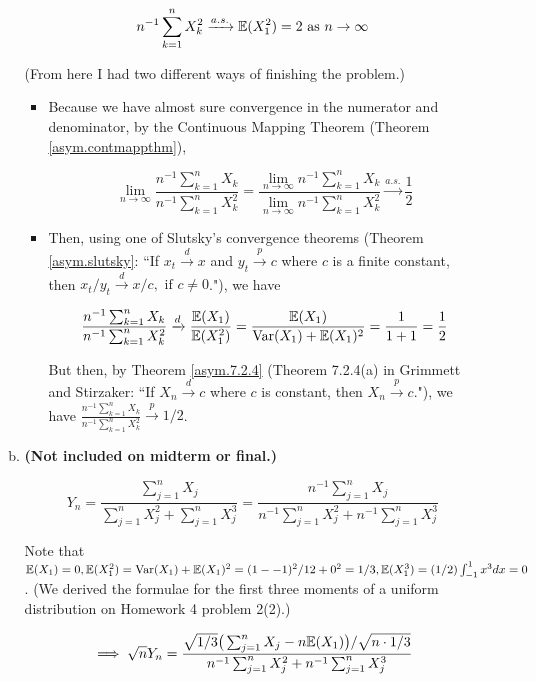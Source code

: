 \begin{enumerate}[(1)]
\begin{enumerate}[(a)]
\[
 n^{-1}\sum_{k=1}^n X_k^2 \xrightarrow{a.s.}\mathbb{E}(X_1^2) = 2 \text{ as } n \to \infty
 \]

(From here I had two different ways of finishing the problem.)

\begin{itemize}

\item 
 
Because we have almost sure convergence in the numerator and denominator, by the Continuous Mapping Theorem (Theorem \ref{asym.contmappthm}),
 
 \[
 \lim_{n \to \infty} \frac{n^{-1}\sum_{k=1}^n X_k}{n^{-1}\sum_{k=1}^n X_k^2} =  \frac{\lim_{n \to \infty} n^{-1}\sum_{k=1}^n X_k}{\lim_{n \to \infty} n^{-1}\sum_{k=1}^n X_k^2} \xrightarrow{a.s.} \boxed{\frac{1}{2}}
 \]

\item 

Then, using one of  Slutsky's convergence theorems (Theorem \ref{asym.slutsky}: ``If \(x_t \xrightarrow{d} x\) and \(y_t \xrightarrow{p} c\) where \(c\) is a finite constant, then \(x_t/y_t \xrightarrow{d}  x/c, \text{ if } c \neq 0\)."), we have

\[
\frac{n^{-1}\sum_{k=1}^n X_k}{n^{-1}\sum_{k=1}^n X_k^2} \xrightarrow{d} \frac{\mathbb{E}(X_1)}{\mathbb{E}(X_1^2)} =  \frac{\mathbb{E}(X_1)}{\mathrm{Var}(X_1) + \mathbb{E}(X_1)^2}  =  \frac{1}{1+1} = \frac{1}{2}
\]

But then, by Theorem \ref{asym.7.2.4} (Theorem 7.2.4(a) in Grimmett and Stirzaker: ``If \(X_n \xrightarrow{d} c\) where \(c\) is constant, then \(X_n \xrightarrow{p} c\)."), we have \(\frac{n^{-1}\sum_{k=1}^n X_k}{n^{-1}\sum_{k=1}^n X_k^2} \xrightarrow{p} 1/2\). 

\end{itemize}

\item \textbf{(Not included on midterm or final.)}

\[
Y_n = \frac{\sum_{j=1}^n X_j}{\sum_{j=1}^n X_j^2 + \sum_{j=1}^n X_j^3} =  \frac{n^{-1}\sum_{j=1}^n X_j}{n^{-1}\sum_{j=1}^n X_j^2 + n^{-1}\sum_{j=1}^n X_j^3} 
\]

Note that \(\mathbb{E}(X_1) = 0, \mathbb{E}(X_1^2) = \mathrm{Var}(X_1) + \mathbb{E}(X_1)^2 = (1 - -1)^2/12 + 0^2 = 1/3 , \mathbb{E}(X_1^3) = (1/2) \int_{-1}^1 x^3 dx = 0 \). (We derived the formulae for the first three moments of a uniform distribution on Homework 4 problem 2(2).) 

\[
\implies \sqrt{n} Y_n =  \frac{\sqrt{1/3} \big(\sum_{j=1}^n X_j - n\mathbb{E}(X_1) \big)/ \sqrt{n \cdot1/3} }{n^{-1}\sum_{j=1}^n X_j^2 + n^{-1}\sum_{j=1}^n X_j^3} 
\]
 

\end{enumerate}
\end{enumerate}
